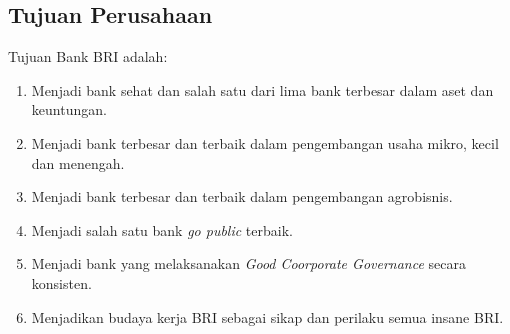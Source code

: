 	\subsection{Tujuan Perusahaan}
	Tujuan Bank BRI adalah:
	\begin{enumerate}
		\item Menjadi bank sehat dan salah satu dari lima bank terbesar dalam aset dan keuntungan.
		\item Menjadi bank terbesar dan terbaik dalam pengembangan usaha mikro, kecil dan menengah.
		\item Menjadi bank terbesar dan terbaik dalam pengembangan agrobisnis.
		\item Menjadi salah satu bank \textit{go public} terbaik.
		\item Menjadi bank yang melaksanakan \textit{Good Coorporate Governance} secara konsisten.
		\item Menjadikan budaya kerja BRI sebagai sikap dan perilaku semua insane BRI.
	\end{enumerate}

